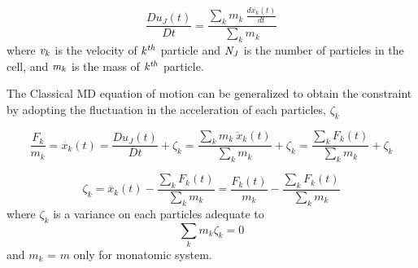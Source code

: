 \documentclass[]{aiaa-tc}%
\begin{document}

\vspace{-.2em}
\begin{equation}
  \frac{Du_{J}(t)}{Dt} = {  \frac{\displaystyle\sum_{k}m_{k}\  \frac{d\dot x_k(t)}{dt} } {\displaystyle\sum_{k}m_{k}}} 
 \label{eq:gov1}
\end{equation}
\normalsize
where $\it v_{k}$ is the velocity of $\it k^{th}$ particle and $\it N_{J}$ is the number of particles in the cell, and $\it m_{k}$ is the mass of $\it k^{th}$ particle. 

The Classical MD equation of motion can be generalized to obtain the constraint by adopting the fluctuation in the acceleration of each particles, $\zeta_{k}$

\vspace{-.2em}
\begin{equation}
\frac{F_{k}}{m_{k}}  =  \ddot{x_{k}}(t) =  \frac{Du_{J}(t)}{Dt} + \zeta_{k} = {  \frac{\displaystyle\sum_{k}m_{k}\  {\ddot x_k(t)}} {\displaystyle\sum_{k}m_{k}}}+ \zeta_{k} =  {  \frac{\displaystyle\sum_{k}F_{k}(t)} {\displaystyle\sum_{k}m_{k}}}+ \zeta_{k}
 \label{eq:zeta1}
\end{equation}

\begin{equation}
\zeta_{k} = \ddot{x_{k}}(t) - {  \frac{\displaystyle\sum_{k}F_{k}(t)} {\displaystyle\sum_{k}m_{k}}}= \frac{F_{k}(t)}{m_{k}} - {  \frac{\displaystyle\sum_{k}F_{k}(t)} {\displaystyle\sum_{k}m_{k}}} 
 \label{eq:zeta2}
\end{equation}
\normalsize
where $\zeta_{k}$ is  a variance on each particles adequate to  \begin{equation}{\displaystyle\sum_{k}m_k\zeta_{k} = 0}\end{equation} and $m_k$  = $m$ only for monatomic system. 
\end{document}
